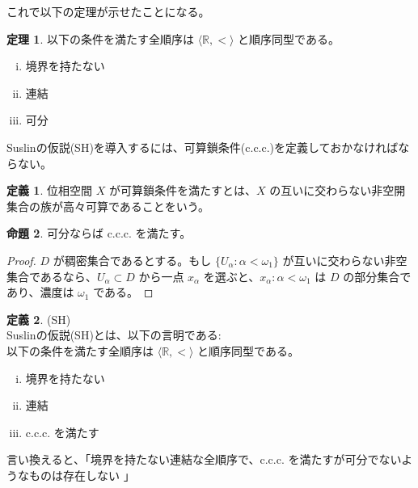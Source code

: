 \documentclass{jsarticle}
\theoremstyle{definition}
\newtheorem*{definition*}{定義}
\newtheorem{theorem}{定理}[section]
\newtheorem{proposition}[theorem]{命題}
\begin{document}
    \vspace{0.5ex}
    これで以下の定理が示せたことになる。
    \vspace{0.5ex}
    
    \begin{theorem}
        以下の条件を満たす全順序は $\langle \mathbb{R}, < \rangle$ と順序同型である。
        \begin{enumerate}[(i)]
            \item 境界を持たない
            \item 連結
            \item 可分
        \end{enumerate}
    \end{theorem}
    
    \vspace{1.5ex}
    Suslinの仮説(SH)を導入するには、可算鎖条件(c.c.c.)を定義しておかなければならない。
    \begin{definition*}
        位相空間 $X$ が可算鎖条件を満たすとは、$X$ の互いに交わらない非空開集合の族が高々可算であることをいう。
    \end{definition*}
    
    \begin{proposition}
        可分ならば c.c.c. を満たす。
    \end{proposition}
    \begin{proof}
        $D$ が稠密集合であるとする。もし $\{U_\alpha : \alpha < \omega_1\}$ が互いに交わらない非空集合であるなら、$U_\alpha \subset D$ から一点 $x_\alpha$ を選ぶと、${x_\alpha : \alpha < \omega_1}$ は $D$ の部分集合であり、濃度は $\omega_1$ である。
    \end{proof}
    
    \begin{definition*} (SH)\\
        Suslinの仮説(SH)とは、以下の言明である:\\
        以下の条件を満たす全順序は $\langle \mathbb{R}, < \rangle$ と順序同型である。
        \begin{enumerate}[(i)]
            \item 境界を持たない
            \item 連結
            \item c.c.c. を満たす
        \end{enumerate}
        言い換えると、「境界を持たない連結な全順序で、c.c.c. を満たすが可分でないようなものは存在しない 」
    \end{definition*}
    
\end{document}
